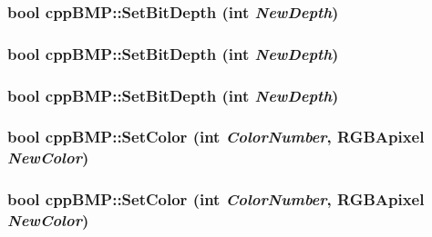 \hypertarget{classcpp_b_m_p_4929652b47f073d3519b07fc05ed9eab}{
\subsubsection[{SetBitDepth}]{\setlength{\rightskip}{0pt plus 5cm}bool cppBMP::SetBitDepth (int {\em NewDepth})}}
\label{classcpp_b_m_p_4929652b47f073d3519b07fc05ed9eab}


\hypertarget{classcpp_b_m_p_4929652b47f073d3519b07fc05ed9eab}{
\subsubsection[{SetBitDepth}]{\setlength{\rightskip}{0pt plus 5cm}bool cppBMP::SetBitDepth (int {\em NewDepth})}}
\label{classcpp_b_m_p_4929652b47f073d3519b07fc05ed9eab}


\hypertarget{classcpp_b_m_p_4929652b47f073d3519b07fc05ed9eab}{
\subsubsection[{SetBitDepth}]{\setlength{\rightskip}{0pt plus 5cm}bool cppBMP::SetBitDepth (int {\em NewDepth})}}
\label{classcpp_b_m_p_4929652b47f073d3519b07fc05ed9eab}


\hypertarget{classcpp_b_m_p_954ee0b08e8b0e9455fe5c4a9e7a7181}{
\subsubsection[{SetColor}]{\setlength{\rightskip}{0pt plus 5cm}bool cppBMP::SetColor (int {\em ColorNumber}, \/  {\bf RGBApixel} {\em NewColor})}}
\label{classcpp_b_m_p_954ee0b08e8b0e9455fe5c4a9e7a7181}


\hypertarget{classcpp_b_m_p_954ee0b08e8b0e9455fe5c4a9e7a7181}{
\subsubsection[{SetColor}]{\setlength{\rightskip}{0pt plus 5cm}bool cppBMP::SetColor (int {\em ColorNumber}, \/  {\bf RGBApixel} {\em NewColor})}}
\label{classcpp_b_m_p_954ee0b08e8b0e9455fe5c4a9e7a7181}



